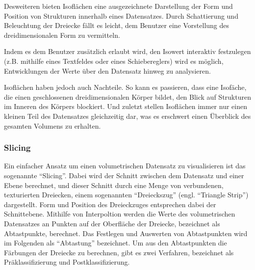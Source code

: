 \documentclass[a4paper,fontsize=12pt,toc=bib,halfparskip]{scrartcl}
\begin{document}
Desweiteren bieten Isofl\"achen eine ausgezeichnete Darstellung der Form und Position von Strukturen innerhalb eines Datensatzes. Durch Schattierung und Beleuchtung der Dreiecke f\"allt es leicht, dem Benutzer eine Vorstellung des dreidimensionalen Form zu vermitteln.

Indem es dem Benutzer zus\"atzlich erlaubt wird, den Isowert interaktiv festzulegen (z.B. mithilfe eines Textfeldes oder eines Schiebereglers) wird es m\"oglich, Entwicklungen der Werte \"uber den Datensatz hinweg zu analysieren.

Isofl\"achen haben jedoch auch Nachteile. So kann es passieren, dass eine Isof\"ache, die einen geschlossenen dreidimensionalen K\"orper bildet, den Blick auf Strukturen im Inneren des K\"orpers blockiert. Und zuletzt stellen Isofl\"achen immer nur einen kleinen Teil des Datensatzes gleichzeitig dar, was es erschwert einen \"Uberblick des gesamten Volumens zu erhalten.

\subsubsection{Slicing}
\label{sec:Slicing}
Ein einfacher Ansatz um einen volumetrischen Datensatz zu visualisieren ist das sogenannte ``Slicing''\cite{munzner2014visualization}. Dabei wird der Schnitt zwischen dem Datensatz und einer Ebene berechnet, und dieser Schnitt durch eine Menge von verbundenen, texturierten Dreiecken, einem sogenannten ``Dreieckszug'' (engl. ``Triangle Strip'') dargestellt. Form und Position des Dreieckzuges entsprechen dabei der Schnittebene. Mithilfe von Interpoltion werden die Werte des volumetrischen Datensatzes an Punkten auf der Oberfl\"ache der Dreiecke, bezeichnet als Abtastpunkte, berechnet. Das Festlegen und Auswerten von Abtastpunkten wird im Folgenden als ``Abtastung'' bezeichnet. Um aus den Abtastpunkten die F\"arbungen der Dreiecke zu berechnen, gibt es zwei Verfahren, bezeichnet als Pr\"aklassifizierung und Postklassifizierung.
\end{document}
